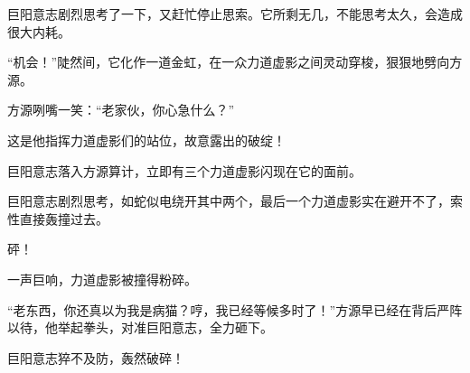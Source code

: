 \begin{this_body}
巨阳意志剧烈思考了一下，又赶忙停止思索。它所剩无几，不能思考太久，会造成很大内耗。

“机会！”陡然间，它化作一道金虹，在一众力道虚影之间灵动穿梭，狠狠地劈向方源。

方源咧嘴一笑：“老家伙，你心急什么？”

这是他指挥力道虚影们的站位，故意露出的破绽！

巨阳意志落入方源算计，立即有三个力道虚影闪现在它的面前。

巨阳意志剧烈思考，如蛇似电绕开其中两个，最后一个力道虚影实在避开不了，索性直接轰撞过去。

砰！

一声巨响，力道虚影被撞得粉碎。

“老东西，你还真以为我是病猫？哼，我已经等候多时了！”方源早已经在背后严阵以待，他举起拳头，对准巨阳意志，全力砸下。

巨阳意志猝不及防，轰然破碎！

\end{this_body}

